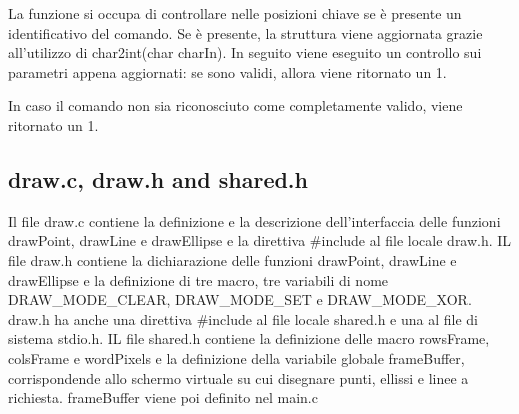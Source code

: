 \documentclass[a4paper]{article}
\begin{document}
			La funzione si occupa di controllare nelle posizioni chiave se è presente un identificativo del comando.
			Se è presente, la struttura viene aggiornata grazie all'utilizzo di char2int(char charIn).
			In seguito viene eseguito un controllo sui parametri appena aggiornati: se sono validi, allora viene
			ritornato un 1.

			In caso il comando non sia riconosciuto come completamente valido, viene ritornato un 1.
      \subsection{draw.c, draw.h and shared.h}
      Il file draw.c contiene la definizione e la descrizione dell'interfaccia delle funzioni drawPoint, drawLine e drawEllipse e la direttiva \#include al file locale draw.h.
      IL file draw.h contiene la dichiarazione delle funzioni drawPoint, drawLine e drawEllipse e la definizione di tre macro, tre variabili di nome DRAW\_MODE\_CLEAR, DRAW\_MODE\_SET e DRAW\_MODE\_XOR.
      draw.h ha anche una direttiva \#include al file locale shared.h e una al file di sistema stdio.h.
      IL file shared.h contiene la definizione delle macro rowsFrame, colsFrame e wordPixels e la definizione della variabile globale frameBuffer,
      corrispondende allo schermo virtuale su cui disegnare punti, ellissi e linee a richiesta. frameBuffer viene poi definito nel main.c
\end{document}
